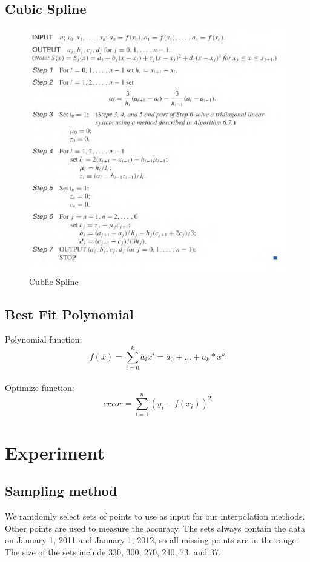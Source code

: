 \documentclass{article}
\begin{document}
\subsection{Cubic Spline}
\begin{figure}[H]
    \centering
    \includegraphics{cubic}
    \caption{Cublic Spline}
\end{figure}
\subsection{Best Fit Polynomial}
Polynomial function: $$f(x) = \sum_{i=0}^{k} a_{i}x^i = a_0 + ... + a_k*x^k$$\\
Optimize function: $$error = \sum_{i=1}^{n} (y_i-f(x_i))^2$$
\section{Experiment}
\subsection{Sampling method}
We ramdomly select sets of points to use as input for our interpolation methods. Other points are used to measure the accuracy. The sets always contain the data on January 1, 2011 and January 1, 2012, so all missing points are in the range. The size of the sets include 330, 300, 270, 240, 73, and 37.
\end{document}
